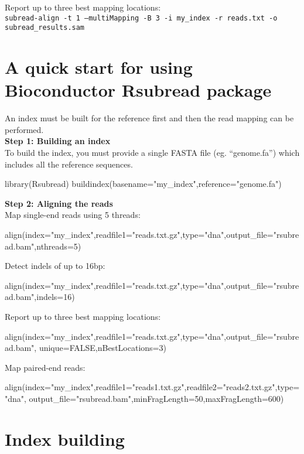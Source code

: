 \documentclass[12pt]{report}
\newcommand{\code}[1]{{\small\texttt{#1}}}
\newcommand{\Rsubread}{\textsf{Rsubread}}
\begin{document}
\noindent Report up to three best mapping locations:\\
\code{subread-align -t 1 --multiMapping -B 3 -i my\_index -r reads.txt -o subread\_results.sam}\\


\section{A quick start for using Bioconductor {\Rsubread} package}

An index must be built for the reference first and then the read mapping can be performed.\\

{\noindent\bf Step 1: Building an index}\\

\noindent To build the index, you must provide a single FASTA file (eg. ``genome.fa'') which includes all the reference sequences.

\begin{Rcode}
library(Rsubread)
buildindex(basename="my_index",reference="genome.fa")
\end{Rcode}

{\noindent\bf Step 2: Aligning the reads}\\

\noindent Map single-end reads using 5 threads:
\begin{Rcode}
align(index="my_index",readfile1="reads.txt.gz",type="dna",output_file="rsubread.bam",nthreads=5)
\end{Rcode}

\noindent Detect indels of up to 16bp:
\begin{Rcode}
align(index="my_index",readfile1="reads.txt.gz",type="dna",output_file="rsubread.bam",indels=16)
\end{Rcode}

\noindent Report up to three best mapping locations:
\begin{Rcode}
align(index="my_index",readfile1="reads.txt.gz",type="dna",output_file="rsubread.bam",
unique=FALSE,nBestLocations=3)
\end{Rcode}

\noindent Map paired-end reads:
\begin{Rcode}
align(index="my_index",readfile1="reads1.txt.gz",readfile2="reads2.txt.gz",type="dna",
output_file="rsubread.bam",minFragLength=50,maxFragLength=600)
\end{Rcode}


\section{Index building}
\label{sec:index}
\end{document}
